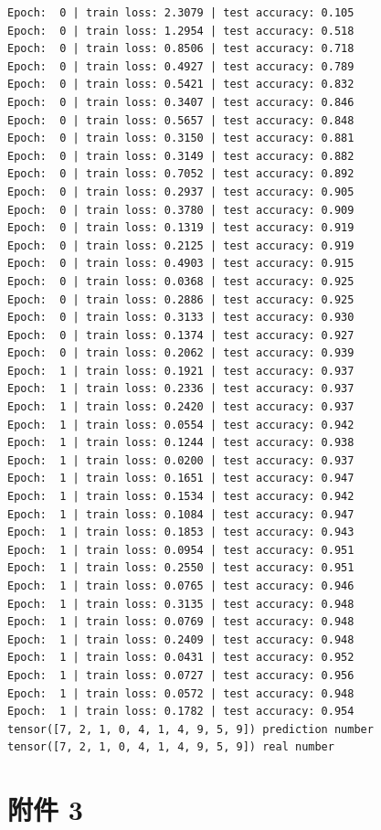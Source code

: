 \documentclass[11pt,UTF8]{ctexart}
\begin{document}
\begin{verbatim}
Epoch:  0 | train loss: 2.3079 | test accuracy: 0.105
Epoch:  0 | train loss: 1.2954 | test accuracy: 0.518
Epoch:  0 | train loss: 0.8506 | test accuracy: 0.718
Epoch:  0 | train loss: 0.4927 | test accuracy: 0.789
Epoch:  0 | train loss: 0.5421 | test accuracy: 0.832
Epoch:  0 | train loss: 0.3407 | test accuracy: 0.846
Epoch:  0 | train loss: 0.5657 | test accuracy: 0.848
Epoch:  0 | train loss: 0.3150 | test accuracy: 0.881
Epoch:  0 | train loss: 0.3149 | test accuracy: 0.882
Epoch:  0 | train loss: 0.7052 | test accuracy: 0.892
Epoch:  0 | train loss: 0.2937 | test accuracy: 0.905
Epoch:  0 | train loss: 0.3780 | test accuracy: 0.909
Epoch:  0 | train loss: 0.1319 | test accuracy: 0.919
Epoch:  0 | train loss: 0.2125 | test accuracy: 0.919
Epoch:  0 | train loss: 0.4903 | test accuracy: 0.915
Epoch:  0 | train loss: 0.0368 | test accuracy: 0.925
Epoch:  0 | train loss: 0.2886 | test accuracy: 0.925
Epoch:  0 | train loss: 0.3133 | test accuracy: 0.930
Epoch:  0 | train loss: 0.1374 | test accuracy: 0.927
Epoch:  0 | train loss: 0.2062 | test accuracy: 0.939
Epoch:  1 | train loss: 0.1921 | test accuracy: 0.937
Epoch:  1 | train loss: 0.2336 | test accuracy: 0.937
Epoch:  1 | train loss: 0.2420 | test accuracy: 0.937
Epoch:  1 | train loss: 0.0554 | test accuracy: 0.942
Epoch:  1 | train loss: 0.1244 | test accuracy: 0.938
Epoch:  1 | train loss: 0.0200 | test accuracy: 0.937
Epoch:  1 | train loss: 0.1651 | test accuracy: 0.947
Epoch:  1 | train loss: 0.1534 | test accuracy: 0.942
Epoch:  1 | train loss: 0.1084 | test accuracy: 0.947
Epoch:  1 | train loss: 0.1853 | test accuracy: 0.943
Epoch:  1 | train loss: 0.0954 | test accuracy: 0.951
Epoch:  1 | train loss: 0.2550 | test accuracy: 0.951
Epoch:  1 | train loss: 0.0765 | test accuracy: 0.946
Epoch:  1 | train loss: 0.3135 | test accuracy: 0.948
Epoch:  1 | train loss: 0.0769 | test accuracy: 0.948
Epoch:  1 | train loss: 0.2409 | test accuracy: 0.948
Epoch:  1 | train loss: 0.0431 | test accuracy: 0.952
Epoch:  1 | train loss: 0.0727 | test accuracy: 0.956
Epoch:  1 | train loss: 0.0572 | test accuracy: 0.948
Epoch:  1 | train loss: 0.1782 | test accuracy: 0.954
tensor([7, 2, 1, 0, 4, 1, 4, 9, 5, 9]) prediction number
tensor([7, 2, 1, 0, 4, 1, 4, 9, 5, 9]) real number
\end{verbatim}

\newpage

\section{附件 3}
\end{document}
